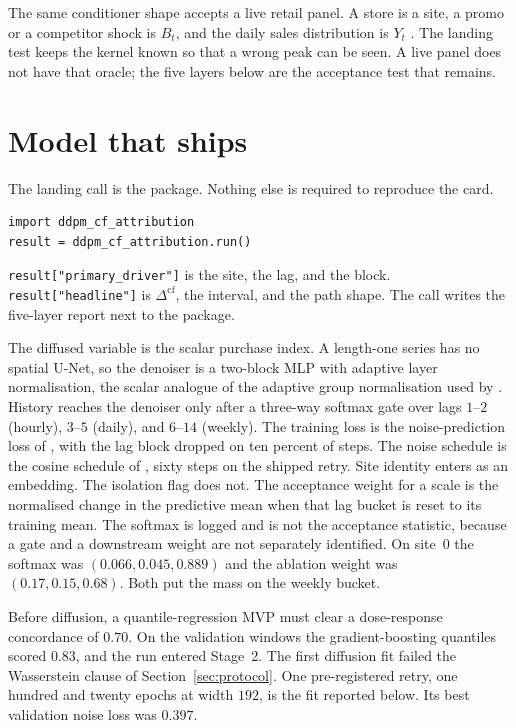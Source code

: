 \documentclass[11pt]{article}
\begin{document}
The same conditioner shape accepts a live retail panel.
A store is a site, a promo or a competitor shock is $B_t$, and the daily sales distribution is $Y_t$ \citep{makridakis2022m5}.
The landing test keeps the kernel known so that a wrong peak can be seen.
A live panel does not have that oracle; the five layers below are the acceptance test that remains.

\section{Model that ships}
\label{sec:model}

The landing call is the package. Nothing else is required to reproduce the card.

\begin{verbatim}
import ddpm_cf_attribution
result = ddpm_cf_attribution.run()
\end{verbatim}

\noindent
\texttt{result["primary\_driver"]} is the site, the lag, and the block.
\texttt{result["headline"]} is $\Delta^{\mathrm{cf}}$, the interval, and the path shape.
The call writes the five-layer report next to the package.

The diffused variable is the scalar purchase index.
A length-one series has no spatial U-Net, so the denoiser is a two-block MLP with adaptive layer normalisation, the scalar analogue of the adaptive group normalisation used by \citet{dhariwal2021diffusion}.
History reaches the denoiser only after a three-way softmax gate over lags $1$--$2$ (hourly), $3$--$5$ (daily), and $6$--$14$ (weekly).
The training loss is the noise-prediction loss of \citet{ho2020denoising}, with the lag block dropped on ten percent of steps.
The noise schedule is the cosine schedule of \citet{nichol2021improved}, sixty steps on the shipped retry.
Site identity enters as an embedding.
The isolation flag does not.
The acceptance weight for a scale is the normalised change in the predictive mean when that lag bucket is reset to its training mean.
The softmax is logged and is not the acceptance statistic, because a gate and a downstream weight are not separately identified.
On site~0 the softmax was $(0.066,0.045,0.889)$ and the ablation weight was $(0.17,0.15,0.68)$.
Both put the mass on the weekly bucket.

Before diffusion, a quantile-regression MVP \citep{koenker2005quantile} must clear a dose-response concordance of $0.70$.
On the validation windows the gradient-boosting quantiles scored $0.83$, and the run entered Stage~2.
The first diffusion fit failed the Wasserstein clause of Section~\ref{sec:protocol}.
One pre-registered retry, one hundred and twenty epochs at width $192$, is the fit reported below.
Its best validation noise loss was $0.397$.
\end{document}
